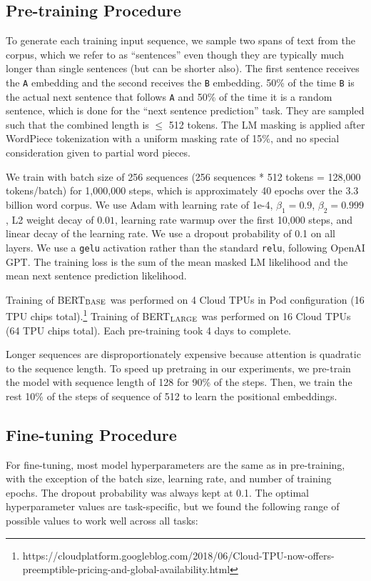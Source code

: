 \documentclass[11pt,a4paper]{article}
\newcommand\bertbase{BERT$_{\small \textsc{BASE}}$\xspace}
\newcommand\bertlarge{BERT$_{\small \textsc{LARGE}}$\xspace}
\begin{document}
\subsection{Pre-training Procedure}
\label{sec:pretraining_procedure}

To generate each training input sequence, we sample two spans of text from the corpus, which we refer to as ``sentences'' even though they are typically much longer than single sentences (but can be shorter also). The first sentence receives the {\tt A} embedding and the second receives the {\tt B} embedding. 50\% of the time {\tt B} is the actual next sentence that follows {\tt A} and 50\% of the time it is a random sentence, which is done for the ``next sentence prediction'' task. They are sampled such that the combined length is $\le$ 512 tokens. The LM masking is applied after WordPiece tokenization with a uniform masking rate of 15\%, and no special consideration given to partial word pieces.

We train with batch size of 256 sequences (256 sequences * 512 tokens = 128,000 tokens/batch) for 1,000,000 steps, which is approximately 40 epochs over the 3.3 billion word corpus. We use Adam with learning rate of 1e-4, ${\beta}_1=0.9$, ${\beta}_2=0.999$, L2 weight decay of $0.01$, learning rate warmup over the first 10,000 steps, and linear decay of the learning rate. We use a dropout probability of 0.1 on all layers. We use a {\tt gelu} activation \cite{hendrycks:2016} rather than the standard {\tt relu}, following OpenAI GPT. The training loss is the sum of the mean masked LM likelihood and the mean next sentence prediction likelihood.

Training of \bertbase was performed on 4 Cloud TPUs in Pod configuration (16 TPU chips total).\footnote{https://cloudplatform.googleblog.com/2018/06/Cloud-TPU-now-offers-preemptible-pricing-and-global-availability.html} Training of \bertlarge was performed on 16 Cloud TPUs (64 TPU chips total). Each pre-training took 4 days to complete.

Longer sequences are disproportionately expensive because attention is quadratic to the sequence length. To speed up pretraing in our experiments, we pre-train the model with sequence length of 128 for 90\% of the steps. Then, we train
the rest 10\% of the steps of sequence of 512 to learn the positional embeddings.

\subsection{Fine-tuning Procedure}
For fine-tuning, most model hyperparameters are the same as in pre-training, with the exception of the batch size, learning rate, and number of training epochs. The dropout probability was always kept at 0.1. The optimal hyperparameter values are task-specific, but we found the following range of possible values to work well across all tasks:
\end{document}
